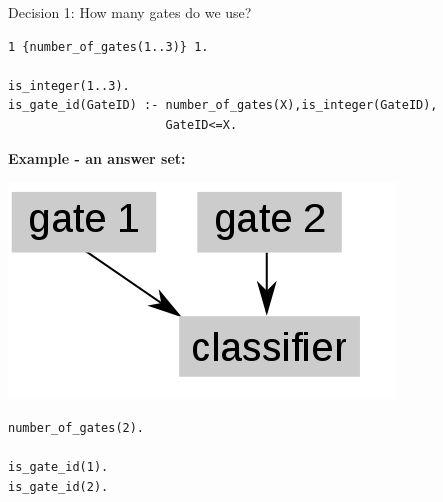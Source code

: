 \documentclass[10pt,dvipsnames]{beamer}
\begin{document}
\begin{frame}[fragile]{Decision 1: How many gates do we use?}
\small
\begin{verbatim}
1 {number_of_gates(1..3)} 1.

is_integer(1..3).
is_gate_id(GateID) :- number_of_gates(X),is_integer(GateID), 
                      GateID<=X.
\end{verbatim}
\vspace{1.3cm}
{\large \color{orange} \textbf{Example - an answer set:}}
\vspace{0.5cm}

\begin{minipage}{0.45\textwidth}
\begin{center}
\includegraphics[scale=0.3]{exp1.png}
\end{center}
\end{minipage}
\hfill
\begin{minipage}{0.45\textwidth}
\begin{verbatim}
number_of_gates(2).

is_gate_id(1).
is_gate_id(2).
\end{verbatim}
\end{minipage}
\end{frame}
\end{document}
